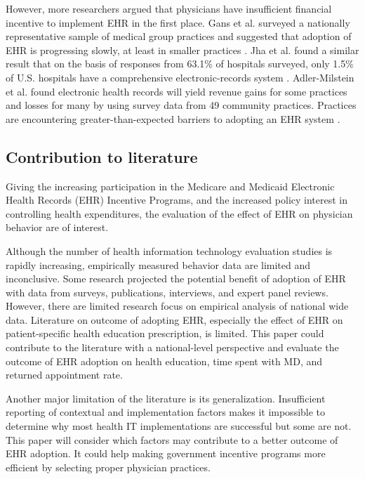 However, more researchers argued that physicians have insufficient financial incentive to implement EHR in the first place. Gans et al. surveyed a nationally representative sample of medical group practices and suggested that adoption of EHR is progressing slowly, at least in smaller practices \citep{Gans2005}. Jha et al. found a similar result that on the basis of responses from 63.1\% of hospitals surveyed, only 1.5\% of U.S. hospitals have a comprehensive electronic-records system \citep{Jha2009}. Adler-Milstein et al. found electronic health records will yield revenue gains for some practices and losses for many by using survey data from 49 community practices. Practices are encountering greater-than-expected barriers to adopting an EHR system \citep{Adler-Milstein2012}.

\subsection{Contribution to literature}

Giving the increasing participation in the Medicare and Medicaid Electronic Health Records (EHR) Incentive Programs, and the increased policy interest in controlling health expenditures, the evaluation of the effect of EHR on physician behavior are of interest.

Although the number of health information technology evaluation studies is rapidly increasing, empirically measured behavior data are limited and inconclusive. Some research projected the potential benefit of adoption of EHR with data from surveys, publications, interviews, and expert panel reviews. However, there are limited research focus on empirical analysis of national wide data. Literature on outcome of adopting EHR, especially the effect of EHR on patient-specific health education prescription, is limited. This paper could contribute to the literature with a national-level perspective and evaluate the outcome of EHR adoption on health education, time spent with MD, and returned appointment rate.

Another major limitation of the literature is its generalization. Insufficient reporting of contextual and implementation factors makes it impossible to determine why most health IT implementations are successful but some are not. This paper will consider which factors may contribute to a better outcome of EHR adoption. It could help making government incentive programs more efficient by selecting proper physician practices.


